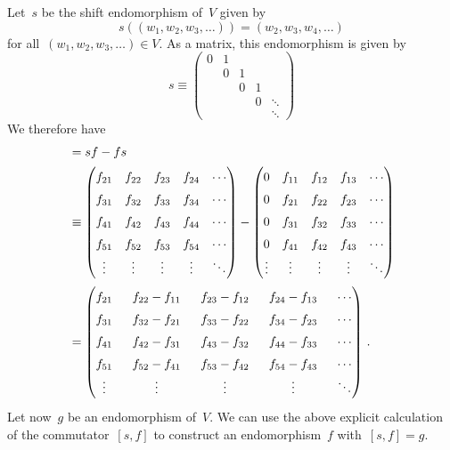 \begin{example}
	Let~$s$ be the shift endomorphism of~$V$ given by
	\[
		s( (w_1, w_2, w_3, \dotsc) )
		=
		( w_2, w_3, w_4, \dotsc )
	\]
	for all~$(w_1, w_2, w_3, \dotsc) \in V$.
	As a matrix, this endomorphism is given by
	\[
		s
		\equiv
		\begin{pmatrix}
			0 & 1 &   &   &         \\
				& 0 & 1 &   &         \\
				&   & 0 & 1 &         \\
				&   &   & 0 & \ddots  \\
				&   &   &   & \ddots
		\end{pmatrix}
	\]
	We therefore have
	\begin{align*}
		[s, f]
		&=
		s f - f s
		\\
		&\equiv
		\begin{pmatrix}
			f_{21}  & f_{22}  & f_{23}  & f_{24}  & \cdots  \\
			f_{31}  & f_{32}  & f_{33}  & f_{34}  & \cdots  \\
			f_{41}  & f_{42}  & f_{43}  & f_{44}  & \cdots  \\
			f_{51}  & f_{52}  & f_{53}  & f_{54}  & \cdots  \\
			\vdots  & \vdots  & \vdots  & \vdots  & \ddots
		\end{pmatrix}
		-
		\begin{pmatrix}
			0       & f_{11}  & f_{12}  & f_{13}  & \cdots  \\
			0       & f_{21}  & f_{22}  & f_{23}  & \cdots  \\
			0	      & f_{31}  & f_{32}  & f_{33}  & \cdots  \\
			0       & f_{41}  & f_{42}  & f_{43}  & \cdots  \\
			\vdots  & \vdots  & \vdots  & \vdots  & \ddots
		\end{pmatrix}
		\\
		&=
		\begingroup
		\renewcommand{\arraystretch}{1.5}
		\arraycolsep=8pt
		\begin{pmatrix}
			f_{21}  & f_{22} - f_{11} & f_{23} - f_{12} & f_{24} - f_{13} & \cdots  \\
			f_{31}  & f_{32} - f_{21} & f_{33} - f_{22} & f_{34} - f_{23} & \cdots  \\
			f_{41}  & f_{42} - f_{31} & f_{43} - f_{32} & f_{44} - f_{33} & \cdots  \\
			f_{51}  & f_{52} - f_{41} & f_{53} - f_{42} & f_{54} - f_{43} & \cdots  \\
			\vdots  & \vdots          & \vdots          & \vdots          & \ddots
		\end{pmatrix} \,.
		\endgroup
	\end{align*}
	Let now~$g$ be an endomorphism of~$V$.
	We can use the above explicit calculation of the commutator~$[s, f]$ to construct an endomorphism~$f$ with~$[s, f] = g$.


\end{example}
